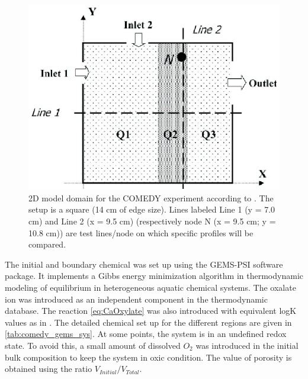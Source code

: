\begin{figure}[!htb]
  \begin{center}
  \includegraphics[scale=1.0]{PART_III/HC/comedy_domain.eps}
  \end{center}
  \caption{2D model domain for the COMEDY experiment according to \cite{Cochepin2008}. The setup is a square (14 cm of edge size). Lines labeled Line 1 (y = 7.0 cm) and Line 2 (x = 9.5 cm) (respectively node N (x = 9.5 cm; y = 10.8 cm)) are test lines/node on which specific profiles will be compared.}
  \label{hc:comedy_domain}
\end{figure}

The initial and boundary chemical was set up using the GEMS-PSI software package. It implements a Gibbs energy minimization algorithm in thermodynamic modeling of equilibrium in heterogeneous aquatic chemical systems. The oxalate ion was introduced as an independent component in the thermodynamic database. The reaction \ref{eq:CaOxylate} was also introduced with equivalent logK values as in \cite{Cochepin2008}. The detailed chemical set up for the different regions are given in \ref{tab:comedy_gems_sys}. At some points, the system is in an undefined redox state. To avoid this, a small amount of dissolved $O_2$ was introduced in the initial bulk composition to keep the system in oxic condition. The value of porosity is obtained using the ratio $V_{Initial} / V_{Total}$. 

